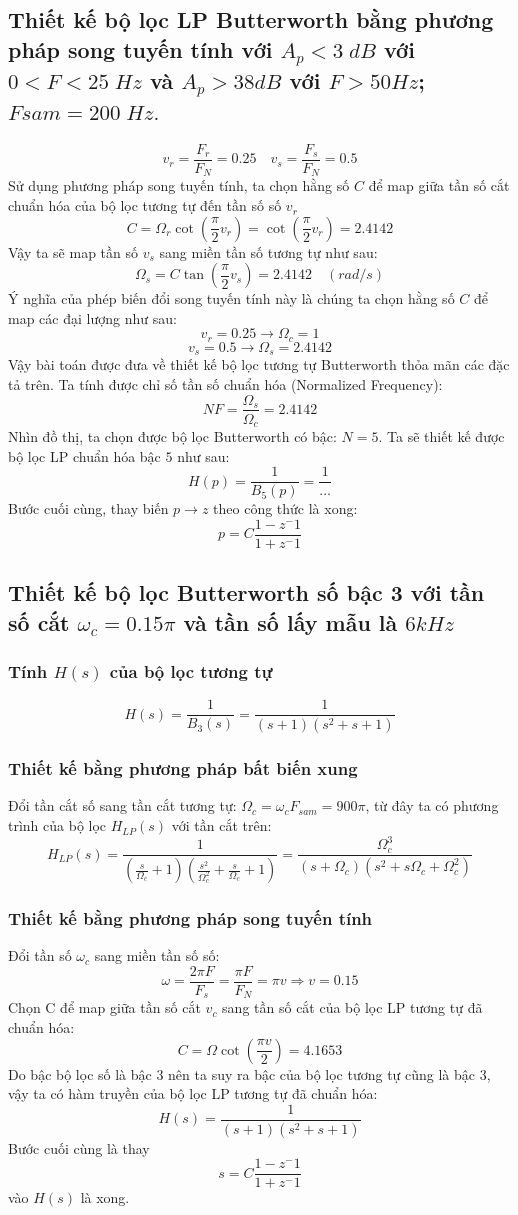 \documentclass{article}
\begin{document}
\subsection{Thiết kế bộ lọc LP Butterworth bằng phương pháp song tuyến tính với $A_{p}<3\; dB$ với $0<F<25\; Hz$ và 
$A_{p}>38dB$ với $F>50Hz$; $Fsam=200\; Hz.$}
$$v_{r}=\frac{F_{r}}{F_{N}}=0.25\quad v_{s}=\frac{F_{s}}{F_{N}}=0.5$$
Sử dụng phương pháp song tuyến tính, ta chọn hằng số $C$ để map giữa tần số cắt chuẩn hóa của bộ lọc tương tự đến tần số số $v_{r}$
$$C=\Omega_{r}\cot{\left(\frac{\pi}{2}v_{r}\right)}=\cot{\left(\frac{\pi}{2}v_{r}\right)}=2.4142$$
Vậy ta sẽ map tần số $v_{s}$ sang miền tần số tương tự như sau:
$$\Omega_{s}=C\tan{\left(\frac{\pi}{2}v_{s}\right)}=2.4142 \quad (rad/s)$$
Ý nghĩa của phép biến đổi song tuyến tính này là chúng ta chọn hằng số $C$ để map các đại lượng như sau:
$$v_{r}=0.25\to \Omega_{c}=1$$ $$v_{s}=0.5\to \Omega_{s}=2.4142$$
Vậy bài toán được đưa về thiết kế bộ lọc tương tự Butterworth thỏa mãn các đặc tả trên. Ta tính được chỉ số tần số chuẩn hóa (Normalized Frequency):
$$NF=\frac{\Omega_{s}}{\Omega_{c}}=2.4142$$
Nhìn đồ thị, ta chọn được bộ lọc Butterworth có bậc: $N=5$.
Ta sẽ thiết kế được bộ lọc LP chuẩn hóa bậc $5$ như sau:
$$H(p)=\frac{1}{B_{5}(p)}=\frac{1}{\dots}$$
Bước cuối cùng, thay biến $p\to z$ theo công thức là xong:
$$p=C\frac{1-z^-1}{1+z^-1}$$
\subsection{Thiết kế bộ lọc Butterworth số bậc 3 với tần số cắt $\omega_{c}=0.15\pi$ và tần số lấy mẫu là $6kHz$}
\subsubsection{Tính $H(s)$ của bộ lọc tương tự}
$$H(s)=\frac{1}{B_{3}(s)}=\frac{1}{(s+1)(s^2+s+1)}$$
\subsubsection{Thiết kế bằng phương pháp bất biến xung}
Đổi tần cắt số sang tần cắt tương tự: $\Omega_{c}=\omega_{c}F_{sam}=900\pi$, từ đây ta có phương trình của bộ lọc $H_{LP}(s)$ với tần cắt trên:
$$H_{LP}(s)=\frac{1}{\left(\frac{s}{\Omega_{c}}+1\right)\left(\frac{s^2}{\Omega_{c}^2}+\frac{s}{\Omega_{c}}+1\right)}=\frac{\Omega_{c}^3}{(s+\Omega_{c})(s^2+s \Omega_{c}+\Omega_{c}^2)}$$
\subsubsection{Thiết kế bằng phương pháp song tuyến tính}
Đổi tần số $\omega_{c}$ sang miền tần số số:
$$\omega=\frac{2\pi F}{F_{s}}=\frac{\pi F}{F_{N}}=\pi v \Rightarrow v=0.15 $$
Chọn C để map giữa tần số cắt $v_{c}$ sang tần số cắt của bộ lọc LP tương tự đã chuẩn hóa:
$$C=\Omega \cot{\left(\frac{\pi v}{2}\right)}=4.1653$$
Do bậc bộ lọc số là bậc 3 nên ta suy ra bậc của bộ lọc tương tự cũng là bậc 3, vậy ta có hàm truyền của bộ lọc LP tương tự đã chuẩn hóa:
$$H(s)=\frac{1}{(s+1)(s^2+s+1)}$$
Bước cuối cùng là thay 
$$s=C\frac{1-z^-1}{1+z^-1}$$ vào $H(s)$ là xong.
\end{document}

